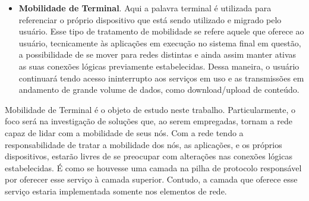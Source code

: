 \documentclass[	12pt, Times, openright, twoside, a4paper, english, brazil]{abntex2}
\begin{document}
\begin{itemize}
   \item \textbf{Mobilidade de Terminal}. Aqui a palavra terminal é utilizada para referenciar o próprio dispositivo que está sendo utilizado e migrado pelo usuário. Esse tipo de tratamento de mobilidade se refere aquele que oferece ao usuário, tecnicamente às aplicações em execução no sistema final em questão, a possibilidade de se mover para redes distintas e ainda assim manter ativas as suas conexões lógicas previamente estabelecidas. Dessa maneira, o usuário continuará tendo acesso ininterrupto aos serviços em uso e as transmissões em andamento de grande volume de dados, como download/upload de conteúdo. 

\end{itemize}


Mobilidade de Terminal é o objeto de estudo neste trabalho. Particularmente,  o foco será na investigação de soluções que, ao serem empregadas, tornam a rede capaz de lidar com a mobilidade de seus nós. Com a rede tendo a responsabilidade de tratar a mobilidade dos nós, as aplicações, e os próprios dispositivos, estarão livres de se preocupar com alterações nas conexões lógicas estabelecidas. É como se houvesse uma camada na pilha de protocolo responsável por oferecer esse serviço à camada superior. Contudo, a camada que oferece esse serviço estaria implementada somente nos elementos de rede.
\end{document}

